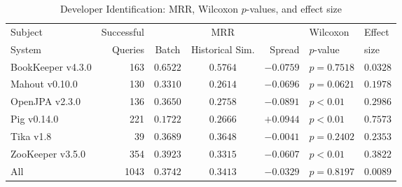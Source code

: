 \begin{table}[t]
\centering
\caption{Developer Identification: MRR, Wilcoxon $p$-values, and effect size}
\begin{tabular}{l|r|ccr|ll}
\toprule
Subject & Successful &    & MRR &        & Wilcoxon  & Effect \\
System  & Queries    & Batch & Historical Sim.  & Spread & $p$-value & size \\
\midrule
BookKeeper v4.3.0 & 163 & $\bm{0.6522}$ & $0.5764$ & $-0.0759$ & $p = 0.7518$ & $0.0328$ \\
Mahout v0.10.0 & 130 & $\bm{0.3310}$ & $0.2614$ & $-0.0696$ & $p = 0.0621$ & $0.1978$ \\
OpenJPA v2.3.0 & 136 & $\bm{0.3650}$ & $0.2758$ & $-0.0891$ & $p < 0.01$ & $0.2986$ \\
Pig v0.14.0 & 221 & $0.1722$ & $\bm{0.2666}$ & $+0.0944$ & $p < 0.01$ & $0.7573$ \\
Tika v1.8 & 39 & $\bm{0.3689}$ & $0.3648$ & $-0.0041$ & $p = 0.2402$ & $0.2353$ \\
ZooKeeper v3.5.0 & 354 & $\bm{0.3923}$ & $0.3315$ & $-0.0607$ & $p < 0.01$ & $0.3822$ \\
\midrule
All & 1043 & $\bm{0.3742}$ & $0.3413$ & $-0.0329$ & $p = 0.8197$ & $0.0089$ \\
\bottomrule
\end{tabular}
\label{table:triage_rq2}
\end{table}
